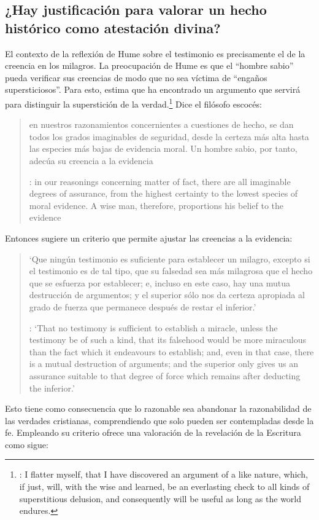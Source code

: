 \subsection{¿Hay justificación para valorar un hecho histórico como atestación divina?}

El contexto de la reflexión de Hume sobre el testimonio es precisamente el de la creencia en los milagros. La preocupación de Hume es que el \enquote{hombre sabio} pueda verificar sus creencias de modo que no sea víctima de \enquote{engaños supersticiosos}. Para esto, estima que ha encontrado un argumento que servirá para distinguir la superstición de la verdad.\footnote{\cite[Cf.~][\S10,1. 73]{hume1777enquiry}: I flatter myself, that I have discovered an argument of a like nature, which, if just, will, with the wise and learned, be an everlasting check to all kinds of superstitious delusion, and consequently will be useful as long as the world endures.} Dice el filósofo escocés: \blockquote[{\cite[\S10,1. 73]{hume1777enquiry}}: in our reasonings concerning matter of fact, there are all imaginable degrees of assurance, from the highest certainty to the lowest species of moral evidence. A wise man, therefore, proportions his belief to the evidence]{en nuestros razonamientos concernientes a cuestiones de hecho, se dan todos los grados imaginables de seguridad, desde la certeza más alta hasta las especies más bajas de evidencia moral. Un hombre sabio, por tanto, adecúa su creencia a la evidencia}.

Entonces sugiere un criterio que permite ajustar las creencias a la evidencia: \blockquote[{\cite[\S10,1. 77]{hume1777enquiry}}: `That no testimony is sufficient to establish a miracle, unless the testimony be of such a kind, that its falsehood would be more miraculous than the fact which it endeavours to establish; and, even in that case, there is a mutual destruction of arguments; and the superior only gives us an assurance suitable to that degree of force which remains after deducting the inferior.']{`Que ningún testimonio es suficiente para establecer un milagro, excepto si el testimonio es de tal tipo, que su falsedad sea más milagrosa que el hecho que se esfuerza por establecer; e, incluso en este caso, hay una mutua destrucción de argumentos; y el superior sólo nos da certeza apropiada al grado de fuerza que permanece después de restar el inferior.'}
\label{subsec:humarg}
Esto tiene como consecuencia que lo razonable sea abandonar la razonabilidad de las verdades cristianas, comprendiendo que solo pueden ser contempladas desde la fe. Empleando su criterio ofrece una valoración de la revelación de la Escritura como sigue:

